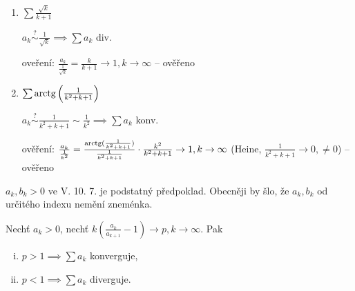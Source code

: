 \begin{priklad}
  \begin{enumerate}[1)]
    \item $\sum \frac{\sqrt{k}}{k+1}$

    $a_k \stackrel{?}{\sim} \frac{1}{\sqrt{k}} \implies \sum a_k$ div.

    oveření: $\frac{a_k}{\frac{1}{\sqrt{k}}} = \frac{k}{k+1} \to 1, k \to \infty$ -- ověřeno

    \item $\sum \operatorname{arctg} \left(\frac{1}{k^2+k+1}\right)$

    $a_k \stackrel{?}{\sim} \frac{1}{k^2+k+1} \sim \frac{1}{k^2} \implies \sum a_k$ konv.

    ověření: $\frac{a_k}{\frac{1}{k^2}} = \frac{\operatorname{arctg}(\frac{1}{k^2+k+1})}{\frac{1}{k^2+k+1}}\cdot \frac{k^2}{k^2+k+1} \to 1, k \to \infty$ (Heine, $\frac{1}{k^2+k+1} \to 0, \neq 0$) -- ověřeno
  \end{enumerate}
\end{priklad}

\begin{poznamka}
  $a_k, b_k >0$ ve V. 10. 7. je podstatný předpoklad. Obecněji by šlo, že $a_k, b_k$ od určitého indexu nemění zneménka.
\end{poznamka}

\begin{veta} Nechť $a_k >0$, nechť $k(\frac{a_k}{a_{k+1}}-1) \to p, k \to \infty$. Pak
  \begin{enumerate}[i)]
    \item $p>1\implies \sum a_k$ konverguje,
    \item $p<1\implies \sum a_k$ diverguje.
  \end{enumerate}
\end{veta}

